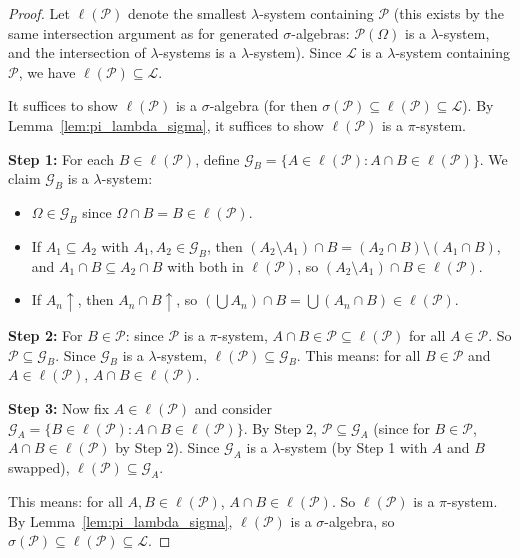 \documentclass[11pt,a4paper]{article}
\theoremstyle{definition}
\theoremstyle{plain}
\theoremstyle{remark}
\newcommand{\powerset}{\mathcal{P}}
\begin{document}
\begin{proof}
Let $\ell(\mathcal{P})$ denote the smallest $\lambda$-system containing $\mathcal{P}$
(this exists by the same intersection argument as for generated $\sigma$-algebras:
$\powerset(\Omega)$ is a $\lambda$-system, and the intersection of $\lambda$-systems
is a $\lambda$-system). Since $\mathcal{L}$ is a $\lambda$-system containing $\mathcal{P}$,
we have $\ell(\mathcal{P}) \subseteq \mathcal{L}$.

It suffices to show $\ell(\mathcal{P})$ is a $\sigma$-algebra (for then $\sigma(\mathcal{P}) \subseteq \ell(\mathcal{P}) \subseteq \mathcal{L}$). By Lemma~\ref{lem:pi_lambda_sigma}, it suffices to show $\ell(\mathcal{P})$ is a $\pi$-system.

\textbf{Step 1:} For each $B \in \ell(\mathcal{P})$, define
$\mathcal{G}_B = \{A \in \ell(\mathcal{P}) : A \cap B \in \ell(\mathcal{P})\}$.
We claim $\mathcal{G}_B$ is a $\lambda$-system:
\begin{itemize}[nosep]
    \item $\Omega \in \mathcal{G}_B$ since $\Omega \cap B = B \in \ell(\mathcal{P})$.
    \item If $A_1 \subseteq A_2$ with $A_1, A_2 \in \mathcal{G}_B$, then $(A_2 \setminus A_1) \cap B = (A_2 \cap B) \setminus (A_1 \cap B)$, and $A_1 \cap B \subseteq A_2 \cap B$ with both in $\ell(\mathcal{P})$, so $(A_2 \setminus A_1) \cap B \in \ell(\mathcal{P})$.
    \item If $A_n \uparrow$, then $A_n \cap B \uparrow$, so $(\bigcup A_n) \cap B = \bigcup(A_n \cap B) \in \ell(\mathcal{P})$.
\end{itemize}

\textbf{Step 2:} For $B \in \mathcal{P}$: since $\mathcal{P}$ is a $\pi$-system,
$A \cap B \in \mathcal{P} \subseteq \ell(\mathcal{P})$ for all $A \in \mathcal{P}$.
So $\mathcal{P} \subseteq \mathcal{G}_B$. Since $\mathcal{G}_B$ is a $\lambda$-system,
$\ell(\mathcal{P}) \subseteq \mathcal{G}_B$. This means: for all $B \in \mathcal{P}$
and $A \in \ell(\mathcal{P})$, $A \cap B \in \ell(\mathcal{P})$.

\textbf{Step 3:} Now fix $A \in \ell(\mathcal{P})$ and consider
$\mathcal{G}_A = \{B \in \ell(\mathcal{P}) : A \cap B \in \ell(\mathcal{P})\}$.
By Step 2, $\mathcal{P} \subseteq \mathcal{G}_A$ (since for $B \in \mathcal{P}$,
$A \cap B \in \ell(\mathcal{P})$ by Step 2). Since $\mathcal{G}_A$ is a
$\lambda$-system (by Step 1 with $A$ and $B$ swapped), $\ell(\mathcal{P}) \subseteq \mathcal{G}_A$.

This means: for all $A, B \in \ell(\mathcal{P})$, $A \cap B \in \ell(\mathcal{P})$.
So $\ell(\mathcal{P})$ is a $\pi$-system. By Lemma~\ref{lem:pi_lambda_sigma},
$\ell(\mathcal{P})$ is a $\sigma$-algebra, so $\sigma(\mathcal{P}) \subseteq \ell(\mathcal{P}) \subseteq \mathcal{L}$.
\end{proof}
\end{document}
